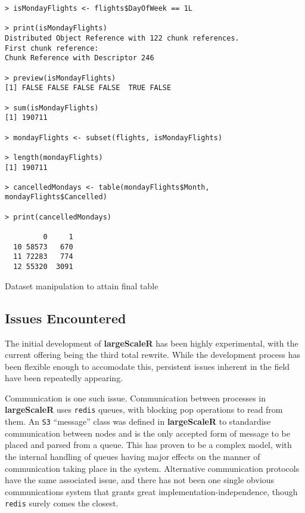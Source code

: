 \begin{listing}%
\begin{verbatim}
> isMondayFlights <- flights$DayOfWeek == 1L

> print(isMondayFlights)
Distributed Object Reference with 122 chunk references.
First chunk reference:
Chunk Reference with Descriptor 246

> preview(isMondayFlights)
[1] FALSE FALSE FALSE FALSE  TRUE FALSE

> sum(isMondayFlights)
[1] 190711

> mondayFlights <- subset(flights, isMondayFlights)

> length(mondayFlights)
[1] 190711

> cancelledMondays <- table(mondayFlights$Month, mondayFlights$Cancelled)

> print(cancelledMondays)

         0     1
  10 58573   670
  11 72283   774
  12 55320  3091
\end{verbatim}
\caption{Dataset manipulation to attain final table}\label{src:manipulation}
\end{listing}

\subsection{Issues Encountered}\label{sec:sys-imp}

The initial development of \textbf{largeScaleR} has been highly experimental, with the current offering being the third total rewrite.
While the development process has been flexible enough to accomodate this, persistent issues inherent in the field have been repeatedly appearing.

Communication is one such issue.
Communication between processes in \textbf{largeScaleR} uses \texttt{redis} queues, with blocking pop operations to read from them.
An \texttt{S3} ``message'' class was defined in \textbf{largeScaleR} to standardise communication between nodes and is the only accepted form of message to be placed and parsed from a queue.
This has proven to be a complex model, with the internal handling of queues having major effects on the manner of communication taking place in the system.
Alternative communication protocols have the same associated issue, and there has not been one single obvious communications system that grants great implementation-independence, though \texttt{redis} surely comes the closest\cite{sanfilippo2009redis}.

